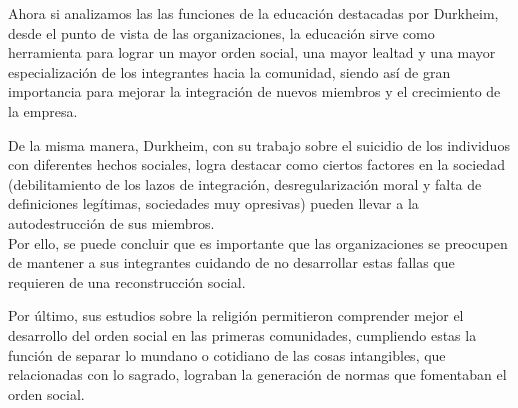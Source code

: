 Ahora si analizamos las las funciones de la educaci\'on destacadas por Durkheim, desde el punto de vista de las organizaciones, 
la educaci\'on sirve como herramienta para lograr un mayor orden social, una mayor lealtad y una mayor especializaci\'on 
de los integrantes hacia la comunidad, siendo as\'i de gran importancia para mejorar la integraci\'on de nuevos miembros
y el crecimiento de la empresa.
	


De la misma manera, Durkheim, con su trabajo sobre el suicidio de los individuos con diferentes hechos sociales, logra destacar como ciertos 
factores en la sociedad (debilitamiento de los lazos de integraci\'on, desregularizaci\'on moral y falta de definiciones 
leg\'itimas, sociedades muy opresivas) pueden llevar a la autodestrucci\'on de sus miembros.\\
Por ello, se puede concluir que  es importante que las organizaciones se preocupen de mantener a sus integrantes 
cuidando de no desarrollar estas fallas que requieren de una reconstrucci\'on social.

Por \'ultimo, sus estudios sobre la religi\'on permitieron comprender mejor el desarrollo del orden social en las primeras comunidades, 
cumpliendo estas la funci\'on de separar lo mundano o cotidiano de las cosas intangibles, que relacionadas con lo sagrado, 
lograban la generaci\'on de normas que fomentaban el orden social.



\newpage

